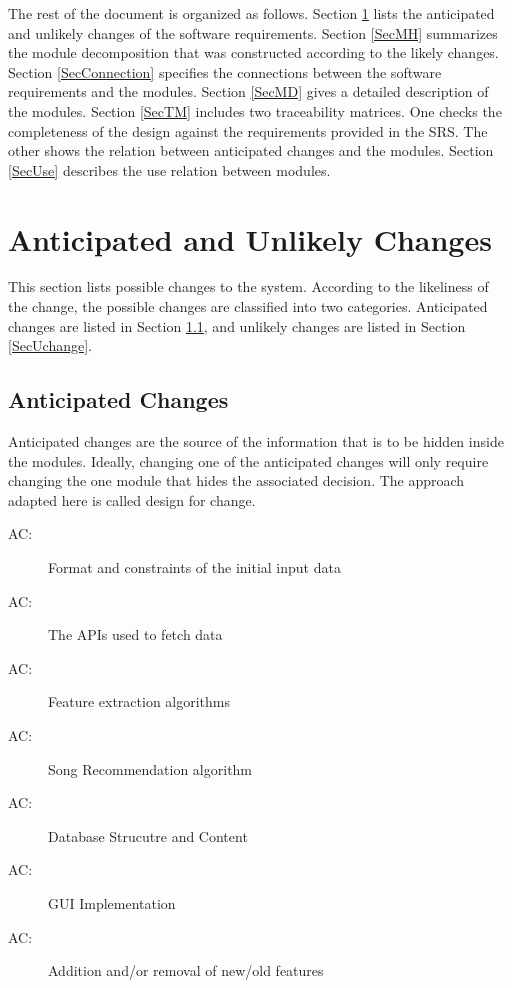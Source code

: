 \documentclass[12pt, titlepage]{article}
\newcounter{acnum}
\newcommand{\actheacnum}{AC\theacnum}
\begin{document}
The rest of the document is organized as follows. Section
\ref{SecChange} lists the anticipated and unlikely changes of the software
requirements. Section \ref{SecMH} summarizes the module decomposition that
was constructed according to the likely changes. Section \ref{SecConnection}
specifies the connections between the software requirements and the
modules. Section \ref{SecMD} gives a detailed description of the
modules. Section \ref{SecTM} includes two traceability matrices. One checks
the completeness of the design against the requirements provided in the SRS. The
other shows the relation between anticipated changes and the modules. Section
\ref{SecUse} describes the use relation between modules.

\section{Anticipated and Unlikely Changes} \label{SecChange}

This section lists possible changes to the system. According to the likeliness
of the change, the possible changes are classified into two
categories. Anticipated changes are listed in Section \ref{SecAchange}, and
unlikely changes are listed in Section \ref{SecUchange}.

\subsection{Anticipated Changes} \label{SecAchange}

Anticipated changes are the source of the information that is to be hidden
inside the modules. Ideally, changing one of the anticipated changes will only
require changing the one module that hides the associated decision. The approach
adapted here is called design for
change.

\begin{description}
\item[ \actheacnum \label{acHardware}:] Format and constraints of the initial input data
\item[ \actheacnum \label{acInput}:] The APIs used to fetch data
\item[ \actheacnum \label{acInput}:] Feature extraction algorithms
\item[ \actheacnum \label{acInput}:] Song Recommendation algorithm
\item[ \actheacnum \label{acInput}:] Database Strucutre and Content
\item[ \actheacnum \label{acInput}:] GUI Implementation
\item[ \actheacnum \label{acInput}:] Addition and/or removal of new/old features
\end{description}
\end{document}
